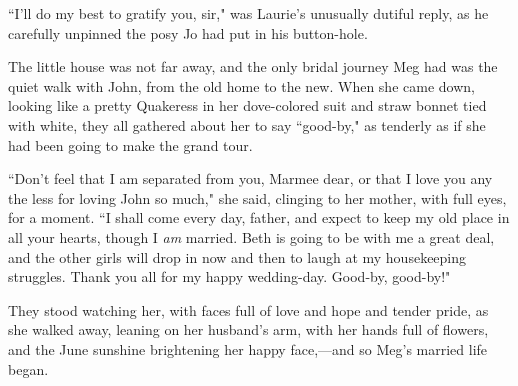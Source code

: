 ``I'll do my best to gratify you, sir," was
Laurie's unusually dutiful reply, as he carefully
unpinned the posy Jo had put in his button-hole.

The little house was not far away, and the only bridal journey Meg had
was the quiet walk with John, from the old home to the new. When she
came down, looking like a pretty Quakeress in her dove-colored suit and
straw bonnet tied with white, they all gathered about her to say
``good-by," as tenderly as if she had been going to make the grand tour.

``Don't feel that I am separated from you, Marmee dear,
or that I love you any the less for loving John so much," she said,
clinging to her mother, with full eyes, for a moment. ``I shall come
every day, father, and expect to keep my old place in all your hearts,
though I \emph{am} married. Beth is going to be with me a great deal,
and the other girls will drop in now and then to laugh at my
housekeeping struggles. Thank you all for my happy wedding-day. Good-by,
good-by!"

They stood watching her, with faces full of love and hope and tender
pride, as she walked away, leaning on her husband's arm,
with her hands full of flowers, and the June sunshine brightening her
happy face,---and so Meg's married life began.
